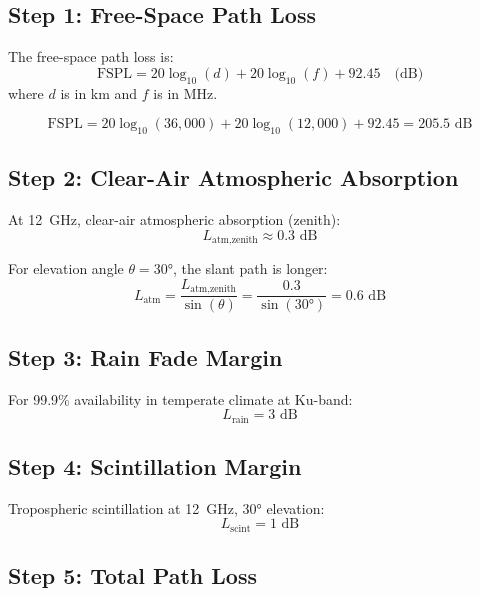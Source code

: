 \subsection*{Step 1: Free-Space Path Loss}

The free-space path loss is:
\begin{equation}
\text{FSPL} = 20\log_{10}(d) + 20\log_{10}(f) + 92.45 \quad \text{(dB)}
\end{equation}
where $d$ is in km and $f$ is in MHz.

\begin{equation}
\text{FSPL} = 20\log_{10}(36{,}000) + 20\log_{10}(12{,}000) + 92.45 = 205.5\text{~dB}
\end{equation}

\subsection*{Step 2: Clear-Air Atmospheric Absorption}

At 12~GHz, clear-air atmospheric absorption (zenith):
\begin{equation}
L_{\text{atm,zenith}} \approx 0.3\text{~dB}
\end{equation}

For elevation angle $\theta = 30°$, the slant path is longer:
\begin{equation}
L_{\text{atm}} = \frac{L_{\text{atm,zenith}}}{\sin(\theta)} = \frac{0.3}{\sin(30°)} = 0.6\text{~dB}
\end{equation}

\subsection*{Step 3: Rain Fade Margin}

For 99.9\% availability in temperate climate at Ku-band:
\begin{equation}
L_{\text{rain}} = 3\text{~dB}
\end{equation}

\subsection*{Step 4: Scintillation Margin}

Tropospheric scintillation at 12~GHz, 30$°$ elevation:
\begin{equation}
L_{\text{scint}} = 1\text{~dB}
\end{equation}

\subsection*{Step 5: Total Path Loss}

